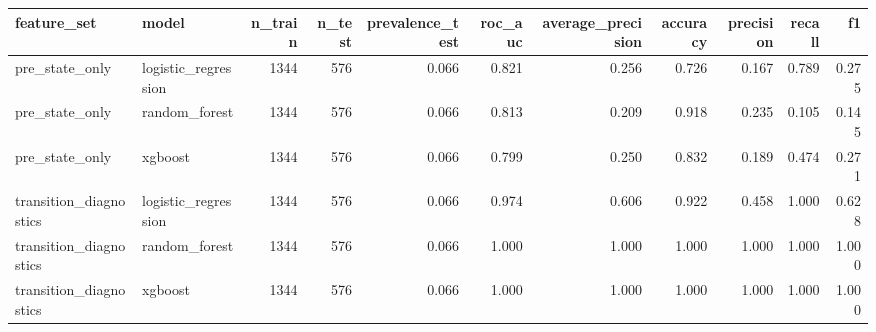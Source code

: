 \begin{tabular}{llrrrrrrrrr}
\toprule
feature_set & model & n_train & n_test & prevalence_test & roc_auc & average_precision & accuracy & precision & recall & f1 \\
\midrule
pre_state_only & logistic_regression & 1344 & 576 & 0.066 & 0.821 & 0.256 & 0.726 & 0.167 & 0.789 & 0.275 \\
pre_state_only & random_forest & 1344 & 576 & 0.066 & 0.813 & 0.209 & 0.918 & 0.235 & 0.105 & 0.145 \\
pre_state_only & xgboost & 1344 & 576 & 0.066 & 0.799 & 0.250 & 0.832 & 0.189 & 0.474 & 0.271 \\
transition_diagnostics & logistic_regression & 1344 & 576 & 0.066 & 0.974 & 0.606 & 0.922 & 0.458 & 1.000 & 0.628 \\
transition_diagnostics & random_forest & 1344 & 576 & 0.066 & 1.000 & 1.000 & 1.000 & 1.000 & 1.000 & 1.000 \\
transition_diagnostics & xgboost & 1344 & 576 & 0.066 & 1.000 & 1.000 & 1.000 & 1.000 & 1.000 & 1.000 \\
\bottomrule
\end{tabular}

